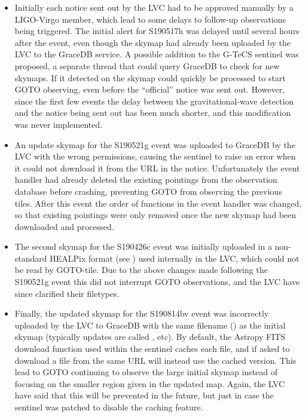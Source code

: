 \begin{colsection}
\begin{itemize}
    \item Initially each notice sent out by the LVC had to be approved manually by a LIGO-Virgo member, which lead to some delays to follow-up observations being triggered. The initial alert for S190517h was delayed until several hours after the event, even though the skymap had already been uploaded by the LVC to the GraceDB service. A possible addition to the G-TeCS sentinel was proposed, a separate thread that could query GraceDB to check for new skymaps. If it detected on the skymap could quickly be processed to start GOTO observing, even before the ``official'' notice was sent out. However, since the first few events the delay between the gravitational-wave detection and the notice being sent out has been much shorter, and this modification was never implemented.
    \item An update skymap for the S190521g event was uploaded to GraceDB by the LVC with the wrong permissions, causing the sentinel to raise an error when it could not download it from the URL in the notice. Unfortunately the event handler had already deleted the existing pointings from the observation database before crashing, preventing GOTO from observing the previous tiles. After this event the order of functions in the event handler was changed, so that existing pointings were only removed once the new skymap had been downloaded and processed.
    \item The second skymap for the S190426c event was initially uploaded in a non-standard HEALPix format (see ) used internally in the LVC, which could not be read by GOTO-tile. Due to the above changes made following the S190521g event this did not interrupt GOTO observations, and the LVC have since clarified their filetypes.
    \item Finally, the updated skymap for the S190814bv event was incorrectly uploaded by the LVC to GraceDB with the same filename () as the initial skymap (typically updates are called , etc). By default, the Astropy FITS download function used within the sentinel caches each file, and if asked to download a file from the same URL will instead use the cached version. This lead to GOTO continuing to observe the large initial skymap instead of focusing on the smaller region given in the updated map. Again, the LVC have said that this will be prevented in the future, but just in case the sentinel was patched to disable the caching feature.
\end{itemize}

\end{colsection}

